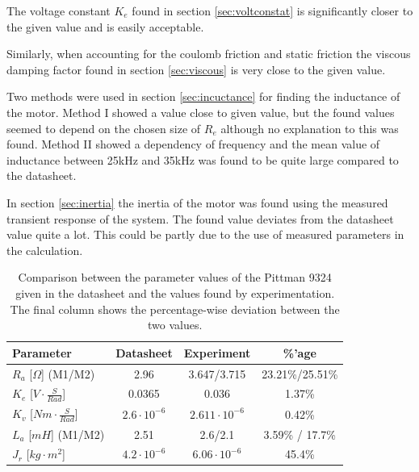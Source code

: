 The voltage constant $K_e$ found in section \ref{sec:voltconstat} is significantly closer to the given value and is easily acceptable.

Similarly, when accounting for the coulomb friction and static friction the viscous damping factor found in section \ref{sec:viscous} is very close to the given value.

Two methods were used in section \ref{sec:incuctance} for finding the inductance of the motor.
Method I showed a value close to given value, but the found values seemed to depend on the chosen size of $R_e$ although no explanation to this was found. 
Method II showed a dependency of frequency and the mean value of inductance between 25kHz and 35kHz was found to be quite large compared to the datasheet.

In section \ref{sec:inertia} the inertia of the motor was found using the measured transient response of the system.
The found value deviates from the datasheet value quite a lot. 
This could be partly due to the use of measured parameters in the calculation.

\begin{table}[!h]
	\centering
	\begin{tabular}{|l|c|c|c|}
		\hline
		Parameter & Datasheet & Experiment & \%'age\\
		\hline
		$R_a$ [$\Omega$] (M1/M2) & 2.96 & 3.647/3.715 & 23.21\%/25.51\%\\
		$K_e$ [$V\cdot\frac{S}{Rad}$]& 0.0365 & 0.036 & 1.37\%\\
		$K_v$ [$Nm\cdot\frac{S}{Rad}$]& $2.6\cdot10^{-6}$ & $2.611\cdot10^{-6}$ & 0.42\%\\
		$L_a$ [$mH$] (M1/M2)& 2.51 & 2.6/2.1 & 3.59\% / 17.7\%\\
		$J_r$ [$kg\cdot m^2$]& $4.2\cdot10^{-6}$& $6.06 \cdot10^{-6}$ & 45.4\%\\
		\hline
	\end{tabular}
	\caption[Comparison of parameter values.]{Comparison between the parameter values of the Pittman 9324 given in the datasheet and the values found by experimentation. The final column shows the percentage-wise deviation between the two values.}
	\label{tab:compare}
\end{table}
